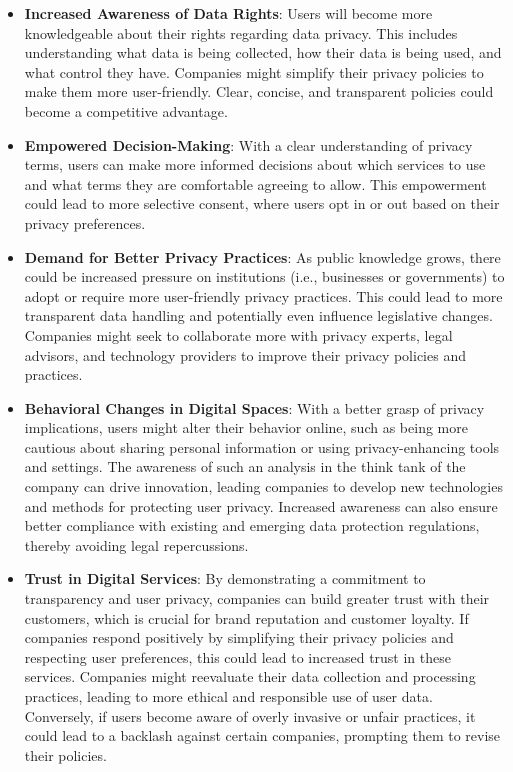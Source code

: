 \begin{itemize}[nosep]
\item \textbf{Increased Awareness of Data Rights}: Users will become more knowledgeable about their rights regarding data privacy.
This includes understanding what data is being collected, how their data is being used, and what control they have.
Companies might simplify their privacy policies to make them more user-friendly.
Clear, concise, and transparent policies could become a competitive advantage.

\item \textbf{Empowered Decision-Making}: With a clear understanding of privacy terms, users can make more informed decisions about which services to use and what terms they are comfortable agreeing to allow.
This empowerment could lead to more selective consent, where users opt in or out based on their privacy preferences.

\item \textbf{Demand for Better Privacy Practices}: As public knowledge grows, there could be increased pressure on institutions (i.e., businesses or governments) to adopt or require more user-friendly privacy practices.
This could lead to more transparent data handling and potentially even influence legislative changes.
Companies might seek to collaborate more with privacy experts, legal advisors, and technology providers to improve their privacy policies and practices.

\item \textbf{Behavioral Changes in Digital Spaces}: With a better grasp of privacy implications, users might alter their behavior online, such as being more cautious about sharing personal information or using privacy-enhancing tools and settings.
The awareness of such an analysis in the think tank of the company can drive innovation, leading companies to develop new technologies and methods for protecting user privacy.
Increased awareness can also ensure better compliance with existing and emerging data protection regulations, thereby avoiding legal repercussions.

\item \textbf{Trust in Digital Services}:
By demonstrating a commitment to transparency and user privacy, companies can build greater trust with their customers, which is crucial for brand reputation and customer loyalty.
If companies respond positively by simplifying their privacy policies and respecting user preferences, this could lead to increased trust in these services.
Companies might reevaluate their data collection and processing practices, leading to more ethical and responsible use of user data.
Conversely, if users become aware of overly invasive or unfair practices, it could lead to a backlash against certain companies, prompting them to revise their policies.


\end{itemize}
